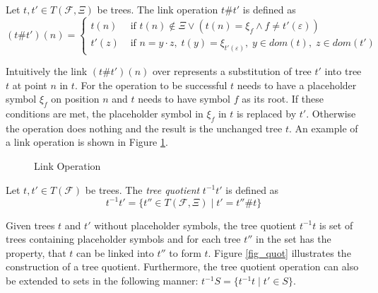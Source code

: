 \begin{defn}
Let $t, t' \in T(\mathcal{F}, \Xi)$ be trees. The link operation $t\#t'$ is defined as
\begin{equation*}
    (t\#t')(n) = 
    \begin{cases}
        t(n) & \text{ if } t(n) \notin \Xi \vee (t(n) = \xi_f \wedge f \neq t'(\varepsilon))\\
        t'(z) & \text{ if } n = y \cdot z, \; t(y) = \xi_{t'(\varepsilon)}, \; y \in dom(t), \; z \in dom(t')
    \end{cases}
\end{equation*}
\end{defn}

Intuitively the link $(t\#t')(n)$ over represents a substitution of tree $t'$ into tree $t$ at point $n$ in $t$. For the operation to be successful $t$ needs to have a placeholder symbol $\xi_f$ on position $n$ and $t$ needs to have symbol $f$ as its root. If these conditions are met, the placeholder symbol in $\xi_f$ in $t$ is replaced by $t'$. Otherwise the operation does nothing and the result is the unchanged tree $t$. An example of a link operation is shown in Figure \ref{fig_link}.

\begin{figure}[H]
    \centering
    \caption{Link Operation}
    \label{fig_link}
\end{figure}

\begin{defn}
Let $t, t' \in T(\mathcal{F})$ be trees. The \emph{tree quotient} $t^{-1}t'$ is defined as $$t^{-1}t' = \{t'' \in T(\mathcal{F}, \Xi) \; | \; t' = t'' \# t\}$$
\end{defn}

Given trees $t$ and $t'$ without placeholder symbols, the tree quotient $t^{-1}t$ is set of trees containing placeholder symbols and for each tree $t''$ in the set has the property, that $t$ can be linked into $t''$ to form $t$. Figure \ref{fig_quot} illustrates the construction of a tree quotient. Furthermore, the tree quotient operation can also be extended to sets in the following manner: $t^{-1}S = \{t^{-1}t \; | \; t' \in S\}$.

